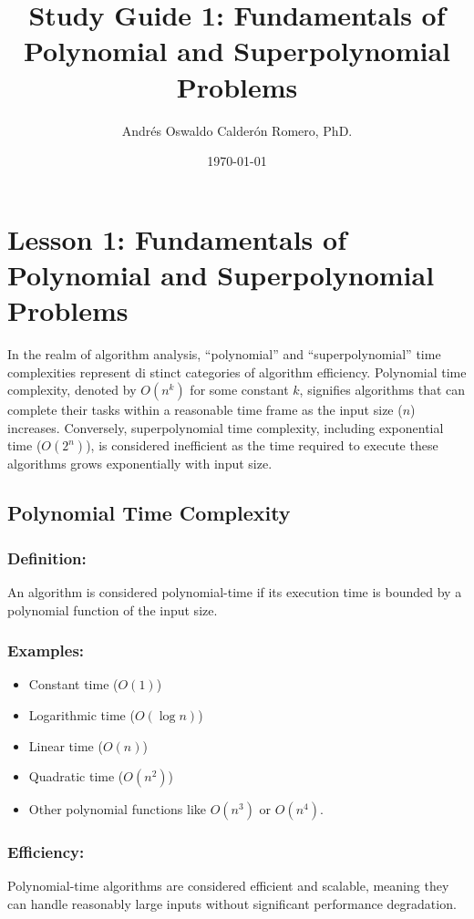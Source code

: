 \documentclass[12pt]{article}
\title{Study Guide 1: Fundamentals of Polynomial and Superpolynomial Problems}
\author{Andrés Oswaldo Calderón Romero, PhD.}
\date{\today}
\begin{document}
    \maketitle

    \section{Lesson 1: Fundamentals of Polynomial and Superpolynomial Problems}

    In the realm of algorithm analysis, ``polynomial'' and ``superpolynomial'' time complexities represent di
     stinct categories of algorithm efficiency. Polynomial time complexity, denoted by $O(n^k)$ for some constant $k$, signifies algorithms that can complete their tasks within a reasonable time frame as the input size ($n$) increases. Conversely, superpolynomial time complexity, including exponential time ($O(2^n)$), is considered inefficient as the time required to execute these algorithms grows exponentially with input size.

    \subsection{Polynomial Time Complexity}

    \subsubsection{Definition:}
    An algorithm is considered polynomial-time if its execution time is bounded by a polynomial function of the input size.

    \subsubsection{Examples:}
    \begin{itemize}
        \item Constant time ($O(1)$)
        \item Logarithmic time ($O(\log n)$)
        \item Linear time ($O(n)$)
        \item Quadratic time ($O(n^2)$)
        \item Other polynomial functions like $O(n^3)$ or $O(n^4)$.
    \end{itemize}

    \subsubsection{Efficiency:}
    Polynomial-time algorithms are considered efficient and scalable, meaning they can handle reasonably large inputs without significant performance degradation.
\end{document}
